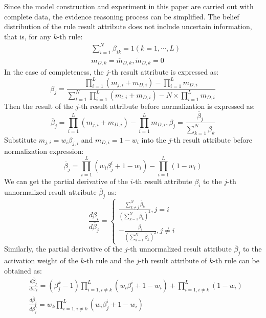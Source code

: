 \documentclass{ieeeaccess}
\begin{document}
Since the model construction and experiment in this paper are carried out with complete data, the evidence reasoning process can be simplified.
The belief distribution of the rule result attribute does not include uncertain information, that is, for any $k$-th rule:
\begin{align}
     & \sum_{i=1}^N\beta_{ik}=1(k=1,\cdots,L)           \\
     & m_{D,k}=\overline{m}_{D,k},\widetilde{m}_{D,k}=0
\end{align}
In the case of completeness, the $j$-th result attribute is expressed as:
\begin{equation}
    \beta_j=\frac{\prod_{i=1}^L(m_{j,i}+m_{D,i})-\prod_{i=1}^Lm_{D,i}}{\sum_{t=1}^N\prod_{i=1}^L(m_{t,i}+m_{D,i})-N\times\prod_{i=1}^Lm_{D,i}}
\end{equation}
Then the result of the $j$-th result attribute before normalization is expressed as:
\begin{equation}
    \overline{\beta}_j = \prod_{i=1}^L(m_{j,i}+m_{D,i})-\prod_{i=1}^Lm_{D,i},\beta_j=\frac{\overline{\beta}_j}{\sum_{k=1}^N\overline{\beta}_k}
\end{equation}
Substitute $m_{j,i}=w_i\beta_{j,i}$ and $m_{D,i}=1-w_i$ into the $j$-th result attribute before normalization expression:
\begin{equation}
    \overline{\beta}_j = \prod_{i=1}^L(w_i\beta_j^i+1-w_i)-\prod_{i=1}^L{(1-w_i)}
\end{equation}
We can get the partial derivative of the $i$-th result attribute $\beta_i$ to the $j$-th unnormalized result attribute $\overline{\beta}_j$ as:
\begin{equation}
    \frac{d\beta_i}{d\overline{\beta}_j}=
    \left\{
    \begin{aligned}
        \frac{\sum_{k\neq j}^N\overline{\beta}_k}{(\sum_{k=1}^N\overline{\beta}_k)^2},j=i \\
        -\frac{\beta_i}{(\sum_{k=1}^N\overline{\beta}_k)^2},j\neq i
    \end{aligned}
    \right.
\end{equation}
Similarly, the partial derivative of the $j$-th unnormalized result attribute $\overline{\beta}_j$ to the activation weight of the $k$-th rule and the $j$-th result attribute of $k$-th rule can be obtained as:
\begin{align}
     & \frac{d\overline{\beta}_j}{dw_k}=(\beta_j^k-1)\prod_{i=1,i\neq k}^L(w_i\beta_j^i+1-w_i)+\prod_{i=1,i\neq k}^L(1-w_i) \\
     & \frac{d\overline{\beta}_j}{d\beta_j^k}=w_k\prod_{i=1,i\neq k}^L(w_i\beta_j^i+1-w_i)
\end{align}
\end{document}
